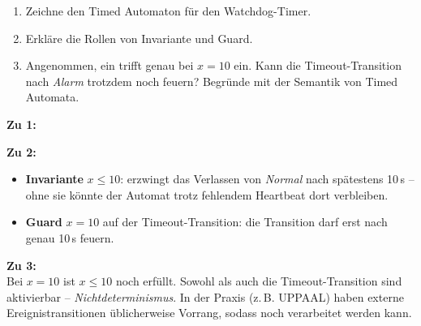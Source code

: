 \begin{enumerate}
    \item Zeichne den Timed Automaton für den Watchdog-Timer.
    \item Erkläre die Rollen von Invariante und Guard.
    \item Angenommen, ein  trifft genau bei $x = 10$ ein. Kann die
          Timeout-Transition nach \textit{Alarm} trotzdem noch feuern? Begründe mit der
          Semantik von Timed Automata.
\end{enumerate}

\begin{loesung}
\textbf{Zu 1:}

\begin{center}
\end{center}

\textbf{Zu 2:}
\begin{itemize}
    \item \textbf{Invariante} $x \leq 10$: erzwingt das Verlassen von \textit{Normal}
          nach spätestens 10\,s -- ohne sie könnte der Automat trotz fehlendem Heartbeat
          dort verbleiben.
    \item \textbf{Guard} $x = 10$ auf der Timeout-Transition: die Transition darf erst
          nach genau 10\,s feuern.
\end{itemize}

\textbf{Zu 3:}\\
Bei $x = 10$ ist $x \leq 10$ noch erfüllt. Sowohl  als auch die
Timeout-Transition sind aktivierbar -- \emph{Nichtdeterminismus}. In der Praxis (z.\,B.
UPPAAL) haben externe Ereignistransitionen üblicherweise Vorrang, sodass 
noch verarbeitet werden kann.
\end{loesung}

